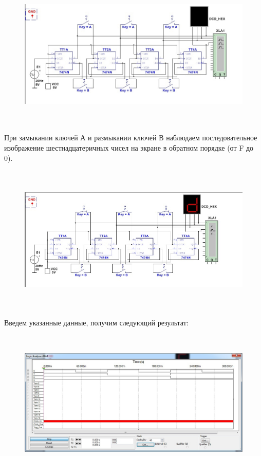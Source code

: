\documentclass[spec, och, labwork]{shiza}
\begin{document}
\begin{figure}[H]
    \centering
    \includegraphics[width=6.11603in,height=2.81061in]{image8.jpeg}
\end{figure}

При замыкании ключей А и размыкании ключей В наблюдаем последовательное
изображение шестнадцатеричных чисел на экране в обратном порядке (от F до 0).

\begin{figure}[H]
    \centering
    \includegraphics[width=6.45865in,height=2.79406in]{image9.jpeg}
\end{figure}

Введем указанные данные, получим следующий результат:

\begin{figure}[H]
    \centering
    \includegraphics[width=6.04692in,height=2.73485in]{image10.jpeg}
\end{figure}
\end{document}
